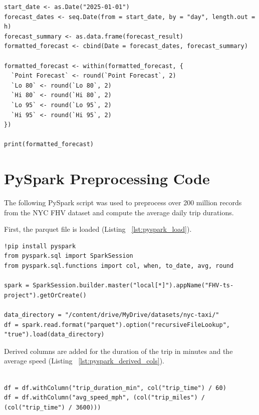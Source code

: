 \documentclass{article}
\begin{document}
\begin{lstlisting}[style=rstyle, caption={ Table of Forecasted Values}, label={lst:r_forecast_table}]
start_date <- as.Date("2025-01-01")
forecast_dates <- seq.Date(from = start_date, by = "day", length.out = h)
forecast_summary <- as.data.frame(forecast_result)
formatted_forecast <- cbind(Date = forecast_dates, forecast_summary)

formatted_forecast <- within(formatted_forecast, {
  `Point Forecast` <- round(`Point Forecast`, 2)
  `Lo 80` <- round(`Lo 80`, 2)
  `Hi 80` <- round(`Hi 80`, 2)
  `Lo 95` <- round(`Lo 95`, 2)
  `Hi 95` <- round(`Hi 95`, 2)
})

print(formatted_forecast)
\end{lstlisting}

\section{PySpark Preprocessing Code}
\label{appendix:pyspark}

The following PySpark script was used to preprocess over 200 million records from the NYC FHV dataset and compute the average daily trip durations.

First, the parquet file is loaded (Listing ~\ref{lst:pyspark_load}).

\begin{lstlisting}[style=pystyle, caption={Loading FHV Data from Parquet Files}, label={lst:pyspark_load}]
!pip install pyspark
from pyspark.sql import SparkSession
from pyspark.sql.functions import col, when, to_date, avg, round

spark = SparkSession.builder.master("local[*]").appName("FHV-ts-project").getOrCreate()

data_directory = "/content/drive/MyDrive/datasets/nyc-taxi/"
df = spark.read.format("parquet").option("recursiveFileLookup", "true").load(data_directory)

\end{lstlisting}

Derived columns are added for the duration of the trip in minutes and the average speed (Listing ~\ref{lst:pyspark_derived_cols}).

\begin{lstlisting}[style=pystyle, caption={Deriving Trip Duration and Average Speed Columns}, label={lst:pyspark_derived_cols}]

df = df.withColumn("trip_duration_min", col("trip_time") / 60)
df = df.withColumn("avg_speed_mph", (col("trip_miles") / (col("trip_time") / 3600)))

\end{lstlisting}
\end{document}
